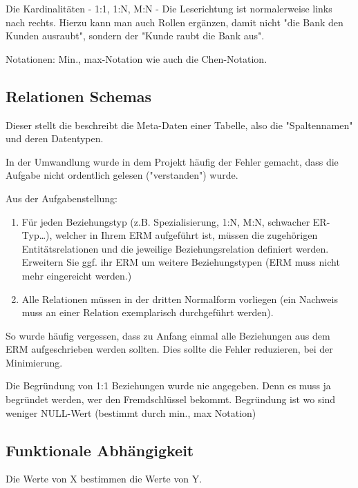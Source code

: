 \documentclass[a4paper]{article}
\begin{document}
Die Kardinalitäten - 1:1, 1:N, M:N - Die Leserichtung ist normalerweise links nach rechts. Hierzu kann man auch Rollen ergänzen, damit nicht "die Bank den Kunden ausraubt", sondern der "Kunde raubt die Bank aus".

Notationen: Min., max-Notation wie auch die Chen-Notation.


\subsection{Relationen Schemas}

Dieser stellt die beschreibt die Meta-Daten einer Tabelle, also die "Spaltennamen" und deren Datentypen.

In der Umwandlung wurde in dem Projekt häufig der Fehler gemacht, dass die Aufgabe nicht ordentlich gelesen ("verstanden") wurde.

Aus der Aufgabenstellung:

\begin{enumerate}
    \item Für jeden Beziehungstyp (z.B. Spezialisierung, 1:N, M:N, schwacher ER-Typ…), welcher in Ihrem ERM aufgeführt ist, müssen die zugehörigen Entitätsrelationen und die jeweilige Beziehungsrelation definiert werden. Erweitern Sie ggf. ihr ERM um weitere Beziehungstypen (ERM muss nicht mehr eingereicht werden.)
    \item Alle Relationen müssen in der dritten Normalform vorliegen (ein Nachweis muss an einer Relation exemplarisch durchgeführt werden).
\end{enumerate}

So wurde häufig vergessen, dass zu Anfang einmal alle Beziehungen aus dem ERM aufgeschrieben werden sollten. Dies sollte die Fehler reduzieren, bei der Minimierung.

Die Begründung von 1:1 Beziehungen wurde nie angegeben. Denn es muss ja begründet werden, wer den Fremdschlüssel bekommt. Begründung ist wo sind weniger NULL-Wert (bestimmt durch min., max Notation)

\subsection{Funktionale Abhängigkeit}

Die Werte von X bestimmen die Werte von Y.
\end{document}

